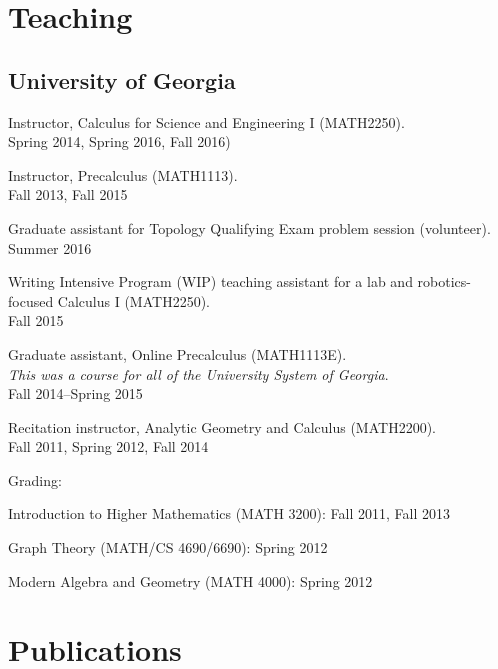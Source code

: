 \documentclass[letterpaper]{article}
\renewenvironment{itemize}{
  \begin{list}{}{
    \setlength{\leftmargin}{1.5em}
  }
}{
  \end{list}
}
\begin{document}
\section*{Teaching}

\subsection*{University of Georgia}

\begin{enumerate}
\item Instructor, Calculus for Science and Engineering I (MATH2250). \\
  Spring 2014, Spring 2016, Fall 2016)
\item Instructor, Precalculus (MATH1113). \\
  Fall 2013, Fall 2015
\item Graduate assistant for Topology Qualifying Exam problem session
  (volunteer). \\
  Summer 2016
\item Writing Intensive Program (WIP) teaching assistant for a lab and
  robotics-focused Calculus I (MATH2250). \\
  Fall 2015
\item Graduate assistant, Online Precalculus (MATH1113E). \\
  \emph{This was a course for all of the University System of Georgia}.\\
  Fall 2014--Spring 2015
\item Recitation instructor, Analytic Geometry and Calculus
  (MATH2200).\\
  Fall 2011, Spring 2012, Fall 2014
\item Grading:
  \begin{itemize}
  \item Introduction to Higher Mathematics (MATH 3200): Fall 2011, Fall 2013
  \item Graph Theory (MATH/CS 4690/6690): Spring 2012
  \item Modern Algebra and Geometry (MATH 4000): Spring 2012
  \end{itemize}

\end{enumerate}

\section*{Publications}
\end{document}
